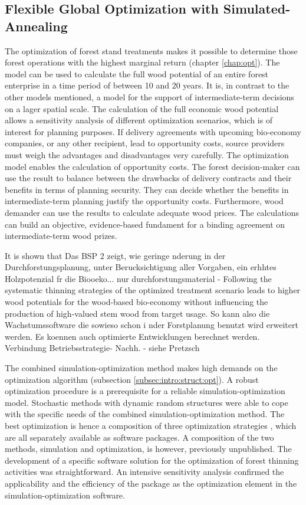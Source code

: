 \subsection{Flexible Global Optimization with Simulated-Annealing}
\label{subsec:discussion:struct:opt}
The optimization of forest stand treatments makes it possible to determine those forest operations with the highest marginal return (chapter \ref{chap:opt}). The model can be used to calculate the full wood potential of an entire forest enterprise in a time period of between 10 and 20 years. It is, in contrast to the other models mentioned, a model for the support of intermediate-term decisions on a lager spatial scale. The calculation of the full economic wood potential allows a sensitivity analysis of different optimization scenarios, which is of interest for planning purposes. If delivery agreements with upcoming bio-economy companies, or any other recipient, lead to opportunity costs, source providers must weigh the advantages and disadvantages very carefully. The optimization model enables the calculation of opportunity costs. The forest decision-maker can use the result to balance between the drawbacks of delivery contracts and their benefits in terms of planning security. They can decide whether the benefits in intermediate-term planning justify the opportunity costs. Furthermore, wood demander can use the results to calculate adequate wood prices. The calculations can build an objective, evidence-based fundament for a binding agreement on intermediate-term wood prizes.

It is shown that 
Das BSP 2 zeigt, wie geringe nderung in der Durchforstungsplanung, unter Berucksichtigung aller Vorgaben, ein erhhtes Holzpotenzial fr die Biooeko... nur durchforstungsmaterial - Following the systematic thinning strategies of the optimized treatment scenario leads to higher wood potentials for the wood-based bio-economy without influencing the production of high-valued stem wood from target usage. 
So kann also die Wachstumssoftware die sowieso schon i nder Forstplanung benutzt wird erweitert werden. Es koennen auch optimierte Entwicklungen berechnet werden.
Verbindung Betriebsstrategie- Nachh. - siehe Pretzsch

The combined si\-mu\-la\-tion-op\-ti\-mi\-za\-tion method makes high demands on the optimization algorithm (subsection \ref{subsec:intro:struct:opt}). A robust optimization procedure is a prerequisite for a reliable si\-mu\-la\-tion-op\-ti\-mi\-za\-tion model. Stochastic methods with dynamic random structures were able to cope with the specific needs of the combined si\-mu\-la\-tion-op\-ti\-mi\-za\-tion method. The best optimization is hence a composition of three optimization strategies \citep{corana_1987, kirkpatrick_1983, pronzato_1984}, which are all separately available as software packages. A composition of the two methods, simulation and optimization, is however, previously unpublished. The development of a specific software solution for the optimization of forest thinning activities was straightforward. An intensive sensitivity analysis confirmed the applicability and the efficiency of the package as the optimization element in the si\-mu\-la\-tion-op\-ti\-mi\-za\-tion software.

